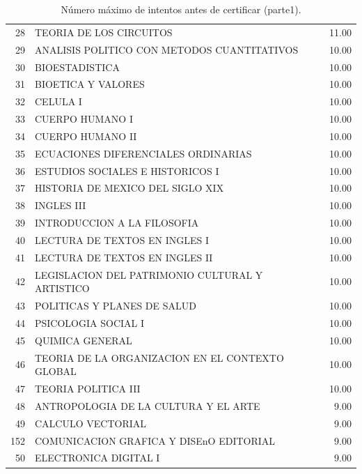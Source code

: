 \documentclass[12pt]{article}
\begin{document}
\begin{table}[ht]
{\begin{tabular}{rlr}
  28 & TEORIA DE LOS CIRCUITOS & 11.00 \\ 
  29 & ANALISIS POLITICO CON METODOS CUANTITATIVOS & 10.00 \\ 
  30 & BIOESTADISTICA & 10.00 \\ 
  31 & BIOETICA Y VALORES & 10.00 \\ 
  32 & CELULA I & 10.00 \\ 
  33 & CUERPO HUMANO I & 10.00 \\ 
  34 & CUERPO HUMANO II & 10.00 \\ 
  35 & ECUACIONES DIFERENCIALES ORDINARIAS & 10.00 \\ 
  36 & ESTUDIOS SOCIALES E HISTORICOS I & 10.00 \\ 
  37 & HISTORIA DE MEXICO DEL SIGLO XIX & 10.00 \\ 
  38 & INGLES III & 10.00 \\ 
  39 & INTRODUCCION A LA FILOSOFIA & 10.00 \\ 
  40 & LECTURA DE TEXTOS EN INGLES I & 10.00 \\ 
  41 & LECTURA DE TEXTOS EN INGLES II & 10.00 \\ 
  42 & LEGISLACION DEL PATRIMONIO CULTURAL Y ARTISTICO & 10.00 \\ 
  43 & POLITICAS Y PLANES DE SALUD & 10.00 \\ 
  44 & PSICOLOGIA SOCIAL I & 10.00 \\ 
  45 & QUIMICA GENERAL & 10.00 \\ 
  46 & TEORIA DE LA ORGANIZACION EN EL CONTEXTO GLOBAL & 10.00 \\ 
  47 & TEORIA POLITICA III & 10.00 \\ 
  48 & ANTROPOLOGIA DE LA CULTURA Y EL ARTE & 9.00 \\ 
  49 & CALCULO VECTORIAL & 9.00 \\ 
  152 & COMUNICACION GRAFICA Y DISEnO EDITORIAL & 9.00 \\ 
  50 & ELECTRONICA DIGITAL I & 9.00 \\ 
   \hline
\end{tabular}}
\caption{\label{Num_Max_Intentos_Cert_0}N\'umero m\'aximo de intentos antes de certificar (parte1).}
\end{table}
\end{document}
